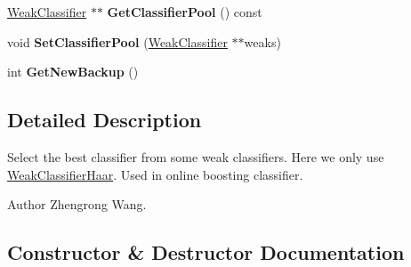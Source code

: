 \begin{DoxyCompactItemize}
\item 
\hypertarget{classClassifierSelector_afd9973943d762de87c049c34bfb8a7fc}{}\hyperlink{classWeakClassifier}{Weak\+Classifier} $\ast$$\ast$ {\bfseries Get\+Classifier\+Pool} () const \label{classClassifierSelector_afd9973943d762de87c049c34bfb8a7fc}

\item 
\hypertarget{classClassifierSelector_a942422f09080814f8e9b914f06a2a403}{}void {\bfseries Set\+Classifier\+Pool} (\hyperlink{classWeakClassifier}{Weak\+Classifier} $\ast$$\ast$weaks)\label{classClassifierSelector_a942422f09080814f8e9b914f06a2a403}

\item 
\hypertarget{classClassifierSelector_a81b945b9d43952b71c5de2c026083f9c}{}int {\bfseries Get\+New\+Backup} ()\label{classClassifierSelector_a81b945b9d43952b71c5de2c026083f9c}

\end{DoxyCompactItemize}


\subsection{Detailed Description}
Select the best classifier from some weak classifiers. Here we only use \hyperlink{classWeakClassifierHaar}{Weak\+Classifier\+Haar}. Used in online boosting classifier. \begin{DoxyAuthor}{Author}
Zhengrong Wang. 
\end{DoxyAuthor}


\subsection{Constructor \& Destructor Documentation}
\hypertarget{classClassifierSelector_a21eb14f2ad33c62dd94fdfced0d8d9e6}{}
